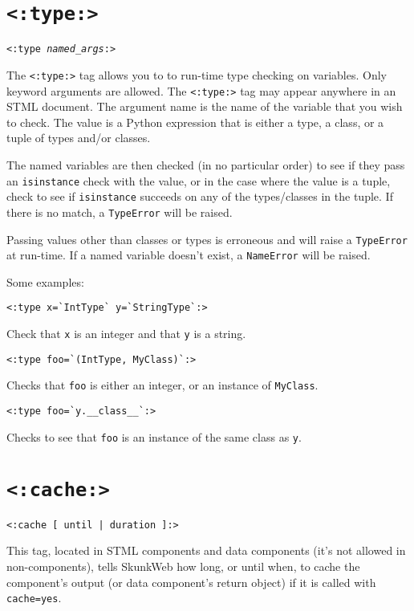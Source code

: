 \documentclass{manual}
\begin{document}
\section{\texttt{<:type:>}}
\label{tagtype}

\texttt{<:type \emph{named_args}:>}

The \texttt{<:type:>} tag allows you to to 
run-time type checking on variables.
Only keyword arguments are allowed.  The \texttt{<:type:>} 
tag may appear anywhere in an STML document. The argument name 
is the name of the variable that you wish to check.  
The value is a Python expression that is either a type, 
a class, or a tuple of types and/or classes.


The named variables are then checked (in no particular order) to see
if they pass an 
\texttt{isinstance} check with the value, or in the case where the
value is a tuple, check to see if \texttt{isinstance} succeeds on any
of the types/classes in the tuple.  If there is no match, a
\texttt{TypeError} will be raised.

Passing values other than classes or types is erroneous and will raise
a \texttt{TypeError} at run-time.  If a named variable doesn't exist, a
\texttt{NameError} will be raised.

Some examples:
\begin{verbatim}
<:type x=`IntType` y=`StringType`:>
\end{verbatim}  
Check that \texttt{x} is an integer and that \texttt{y} is a string.

\begin{verbatim}
<:type foo=`(IntType, MyClass)`:>
\end{verbatim}
Checks that \texttt{foo} is either an integer, or an instance of
\texttt{MyClass}.

\begin{verbatim}
<:type foo=`y.__class__`:>
\end{verbatim}
Checks to see that \texttt{foo} is an instance of the same class as
\texttt{y}.



\section{\texttt{<:cache:>}}
\label{tagcache}

\begin{verbatim}<:cache [ until | duration ]:>\end{verbatim}

This tag, located in STML components and data components
(it's not allowed in non-components), tells SkunkWeb how long,
or until when, to cache the component's output (or
data component's return object) if it is called with
\texttt{cache=yes}.
\end{document}
